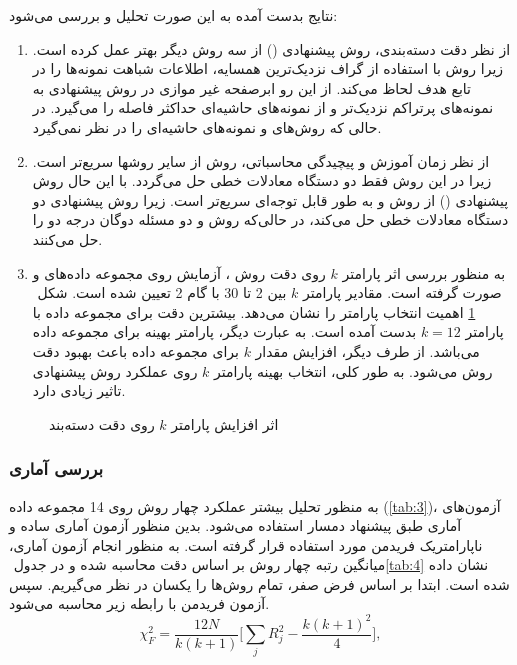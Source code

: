 نتایج بدست آمده به این صورت تحلیل و بررسی می‌شود:
\begin{enumerate}
	\item از نظر دقت دسته‌بندی، روش پیشنهادی () از سه روش دیگر بهتر عمل کرده است. زیرا روش  با استفاده از گراف نزدیک‌ترین همسایه، اطلاعات شباهت نمونه‌ها را در تابع هدف لحاظ می‌کند. از این رو ابرصفحه غیر موازی در روش پیشنهادی به نمونه‌های پرتراکم نزدیک‌تر و از نمونه‌های حاشیه‌ای حداکثر فاصله را می‌گیرد. در حالی که روش‌های  و   نمونه‌های حاشیه‌ای را در نظر نمی‌گیرد.
	\item از نظر زمان آموزش و پیچیدگی محاسباتی، روش  از سایر روشها سریع‌تر است. زیرا در این روش فقط دو دستگاه معادلات خطی حل می‌گردد. با این حال روش پیشنهادی () از روش  و  به طور قابل توجه‌ای سریع‌تر است. زیرا روش پیشنهادی دو دستگاه معادلات خطی حل می‌کند، در حالی‌که روش  و  دو مسئله دوگان درجه دو را حل می‌کنند.
	\item به منظور بررسی اثر پارامتر  $k$ روی دقت روش ، آزمایش روی مجموعه داده‌های  و  صورت گرفته است. مقادیر پارامتر  $k$ بین 2 تا 30 با گام 2 تعیین شده است. شکل ‏ \ref{fig:KNN-LSTSVM-Aust-Hepa} اهمیت انتخاب پارامتر   را نشان می‌دهد. بیشترین دقت برای مجموعه داده  با پارامتر  $k=12$ بدست آمده است. به عبارت دیگر،  پارامتر بهینه برای مجموعه داده  می‌باشد. از طرف دیگر، افزایش مقدار  $k$ برای مجموعه داده  باعث بهبود دقت روش  می‌شود. به طور کلی، انتخاب بهینه پارامتر  $k$ روی عملکرد روش پیشنهادی تاثیر زیادی دارد.
\end{enumerate}

\begin{figure}[!t]
	\centering
	\caption{اثر افزایش پارامتر $k$ روی دقت دسته‌بند }
	\label{fig:KNN-LSTSVM-Aust-Hepa}
\end{figure}

\subsubsection{بررسی آماری}\label{sec:5:2:3:1}
به منظور تحلیل بیشتر عملکرد چهار روش روی 14 مجموعه داده (\ref{tab:3})، آزمون‌های آماری طبق پیشنهاد دمسار \cite{demsar2006} استفاده می‌شود. بدین منظور آزمون آماری ساده و ناپارامتریک فریدمن  مورد استفاده قرار گرفته است. به منظور انجام آزمون آماری، میانگین رتبه چهار روش بر اساس دقت محاسبه شده و در جدول ‏\ref{tab:4} نشان داده شده است. ابتدا بر اساس فرض صفر، تمام روش‌ها را یکسان در نظر می‌گیریم. سپس آزمون فریدمن با رابطه زیر محاسبه می‌شود.
\begin{equation}\label{eq:5:1}
\chi^2_F = \frac{12N}{k(k + 1)}\bigg[\sum_{j} R^2_j - \frac{k(k + 1)^2}{4} \bigg],
\end{equation}

